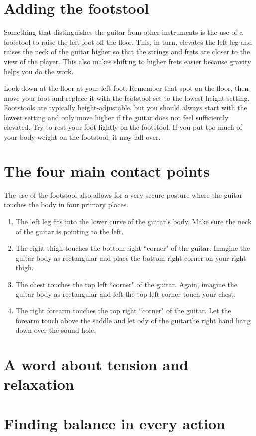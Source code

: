 \section{Adding the footstool}

Something that distinguishes the guitar from other instruments is the use of a footstool to raise the left foot off the floor. This, in turn, elevates the left leg and raises the neck of the guitar higher so that the strings and frets are closer to the view of the player. This also makes shifting to higher frets easier because gravity helps you do the work.



Look down at the floor at your left foot. Remember that spot on the floor, then move your foot and replace it with the footstool set to the lowest height setting. Footstools are typically height-adjustable, but you should always start with the lowest setting and only move higher if the guitar does not feel sufficiently elevated. Try to rest your foot lightly on the footstool. If you put too much of your body weight on the footstool, it may fall over.

\section{The four main contact points}

The use of the footstool also allows for a very secure posture where the guitar touches the body in four primary places.

\begin{enumerate}
	
	\item The left leg fits into the lower curve of the guitar's body. Make sure the neck of the guitar is pointing to the left.
	
	\item The right thigh touches the bottom right ``corner" of the guitar. Imagine the guitar body as rectangular and place the bottom right corner on your right thigh.
	
	\item The chest touches the top left ``corner" of the guitar. Again, imagine the guitar body as rectangular and left the top left corner touch your chest.
	
	\item The right forearm touches the top right ``corner" of the guitar. Let the forearm touch above the saddle and let ody of the guitarthe right hand hang down over the sound hole.
	
\end{enumerate}


\section{A word about tension and relaxation}

\section{Finding balance in every action}



